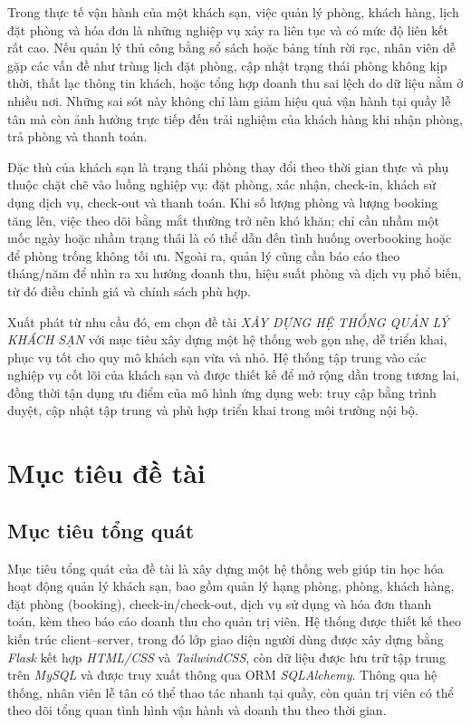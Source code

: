 \documentclass[13pt,a4paper]{extreport}
\newcommand{\TenDeTai}{XÂY DỰNG HỆ THỐNG QUẢN LÝ KHÁCH SẠN}
\begin{document}
Trong thực tế vận hành của một khách sạn, việc quản lý phòng, khách hàng, lịch đặt phòng và hóa đơn là những nghiệp vụ xảy ra liên tục và có mức độ liên kết rất cao. Nếu quản lý thủ công bằng sổ sách hoặc bảng tính rời rạc, nhân viên dễ gặp các vấn đề như trùng lịch đặt phòng, cập nhật trạng thái phòng không kịp thời, thất lạc thông tin khách, hoặc tổng hợp doanh thu sai lệch do dữ liệu nằm ở nhiều nơi. Những sai sót này không chỉ làm giảm hiệu quả vận hành tại quầy lễ tân mà còn ảnh hưởng trực tiếp đến trải nghiệm của khách hàng khi nhận phòng, trả phòng và thanh toán.

Đặc thù của khách sạn là trạng thái phòng thay đổi theo thời gian thực và phụ thuộc chặt chẽ vào luồng nghiệp vụ: đặt phòng, xác nhận, check-in, khách sử dụng dịch vụ, check-out và thanh toán. Khi số lượng phòng và lượng booking tăng lên, việc theo dõi bằng mắt thường trở nên khó khăn; chỉ cần nhầm một mốc ngày hoặc nhầm trạng thái là có thể dẫn đến tình huống overbooking hoặc để phòng trống không tối ưu. Ngoài ra, quản lý cũng cần báo cáo theo tháng/năm để nhìn ra xu hướng doanh thu, hiệu suất phòng và dịch vụ phổ biến, từ đó điều chỉnh giá và chính sách phù hợp.

Xuất phát từ nhu cầu đó, em chọn đề tài \emph{\TenDeTai} với mục tiêu xây dựng một hệ thống web gọn nhẹ, dễ triển khai, phục vụ tốt cho quy mô khách sạn vừa và nhỏ. Hệ thống tập trung vào các nghiệp vụ cốt lõi của khách sạn và được thiết kế để mở rộng dần trong tương lai, đồng thời tận dụng ưu điểm của mô hình ứng dụng web: truy cập bằng trình duyệt, cập nhật tập trung và phù hợp triển khai trong môi trường nội bộ.

\section{Mục tiêu đề tài}

\subsection{Mục tiêu tổng quát}

Mục tiêu tổng quát của đề tài là xây dựng một hệ thống web giúp tin học hóa hoạt động quản lý khách sạn, bao gồm quản lý hạng phòng, phòng, khách hàng, đặt phòng (booking), check-in/check-out, dịch vụ sử dụng và hóa đơn thanh toán, kèm theo báo cáo doanh thu cho quản trị viên. Hệ thống được thiết kế theo kiến trúc client--server, trong đó lớp giao diện người dùng được xây dựng bằng \emph{Flask} kết hợp \emph{HTML/CSS} và \emph{TailwindCSS}, còn dữ liệu được lưu trữ tập trung trên \emph{MySQL} và được truy xuất thông qua ORM \emph{SQLAlchemy}. Thông qua hệ thống, nhân viên lễ tân có thể thao tác nhanh tại quầy, còn quản trị viên có thể theo dõi tổng quan tình hình vận hành và doanh thu theo thời gian.
\end{document}
